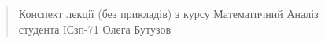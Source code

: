 \documentclass[a4paper, 12pt, oneside, titlepage, BCOR=1mm, DIV=12]{article}
\begin{document}
\begin{center}\Huge{}\end{center}

\flushright
\begin{quote}Конспект лекції (без прикладів) з курсу Математичний Аналіз
  \\ студента ІСзп-71 Олега Бутузов\end{quote}
\flushleft









\end{document}
